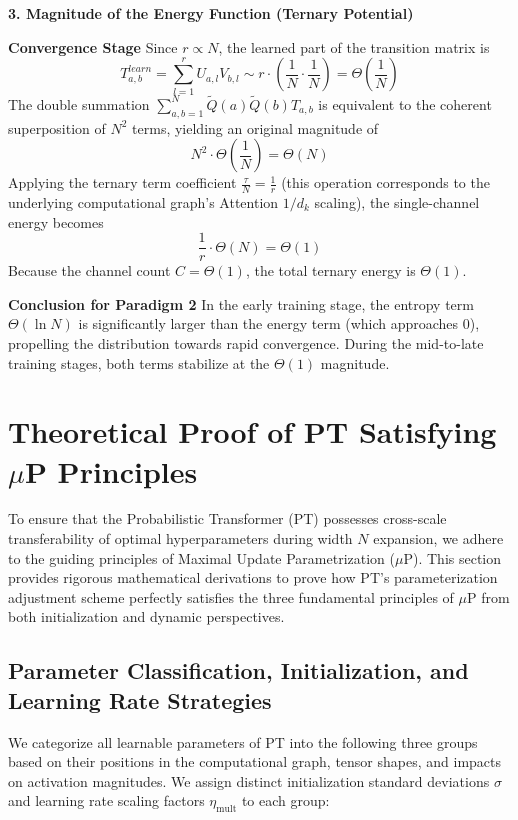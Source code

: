 \documentclass[11pt]{article}
\begin{document}
\textbf{3. Magnitude of the Energy Function (Ternary Potential)}

\textbf{Convergence Stage} Since $r \propto N$, the learned part of the transition matrix is
\begin{equation}
    T_{a,b}^{learn} = \sum_{l=1}^r U_{a,l} V_{b,l} \sim r \cdot (\frac{1}{N} \cdot \frac{1}{N}) = \Theta(\frac{1}{N})
\end{equation}
The double summation $\sum_{a,b=1}^N \tilde{Q}(a)\tilde{Q}(b) T_{a,b}$ is equivalent to the coherent superposition of $N^2$ terms, yielding an original magnitude of
\begin{equation}
    N^2 \cdot \Theta(\frac{1}{N}) = \Theta(N)
\end{equation}
Applying the ternary term coefficient $\frac{\tau}{N} = \frac{1}{r}$ (this operation corresponds to the underlying computational graph's Attention $1/d_k$ scaling), the single-channel energy becomes 
\begin{equation}
    \frac{1}{r} \cdot \Theta(N) = \Theta(1)
\end{equation}
Because the channel count $C = \Theta(1)$, the total ternary energy is $\Theta(1)$.

\textbf{Conclusion for Paradigm 2} In the early training stage, the entropy term $\Theta(\ln N)$ is significantly larger than the energy term (which approaches 0), propelling the distribution towards rapid convergence. During the mid-to-late training stages, both terms stabilize at the $\Theta(1)$ magnitude.

\section{Theoretical Proof of PT Satisfying $\mu$P Principles}\label{app:C}
To ensure that the Probabilistic Transformer (PT) possesses cross-scale transferability of optimal hyperparameters during width $N$ expansion, we adhere to the guiding principles of Maximal Update Parametrization ($\mu$P). This section provides rigorous mathematical derivations to prove how PT's parameterization adjustment scheme perfectly satisfies the three fundamental principles of $\mu$P from both initialization and dynamic perspectives.

\subsection{Parameter Classification, Initialization, and Learning Rate Strategies}

We categorize all learnable parameters of PT into the following three groups based on their positions in the computational graph, tensor shapes, and impacts on activation magnitudes. We assign distinct initialization standard deviations $\sigma$ and learning rate scaling factors $\eta_{\text{mult}}$ to each group:
\end{document}
